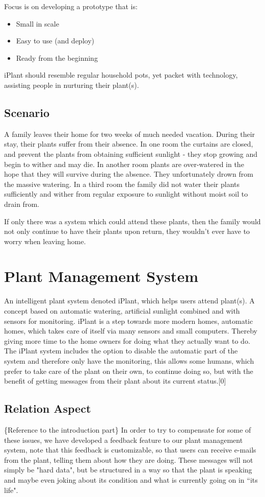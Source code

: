 \documentclass{ubicomp2012}
\begin{document}
Focus is on developing a prototype that is:
\begin{itemize}
    \item Small in scale
    \item Easy to use (and deploy)
    \item Ready from the beginning
\end{itemize}

iPlant should resemble regular household pots, yet packet with technology, assisting people in nurturing their plant(s).

\subsection{Scenario}
A family leaves their home for two weeks of much needed vacation. During their stay, their plants suffer from their absence.
In one room the curtains are closed, and prevent the plants from obtaining sufficient sunlight - they stop growing and begin to wither and may die.
In another room plants are over-watered in the hope that they will survive during the absence. They unfortunately drown from the massive watering.
In a third room the family did not water their plants sufficiently and wither from regular exposure to sunlight without moist soil to drain from.

If only there was a system which could attend these plants, then the family would not only continue to have their plants upon return, they wouldn't ever have to worry when leaving home.

\section{Plant Management System}
An intelligent plant system denoted iPlant, which helps users attend plant(s). A concept based on automatic watering, artificial sunlight combined and with sensors for monitoring.
iPlant is a step towards more modern homes, automatic homes, which takes care of itself via many sensors and small computers. Thereby giving more time to the home owners for doing what they actually want to do.
The iPlant system includes the option to disable the automatic part of the system and therefore only have the monitoring, this allows some humans, which prefer to take care of the plant on their own, to continue doing so, but with the benefit of getting messages from their plant about its current status.[0]

\subsection{Relation Aspect}
\{Reference to the introduction part\}
In order to try to compensate for some of these issues, we have developed a feedback feature to our plant management system, note that this feedback is customizable, so that users can receive e-mails from the plant, telling them about how they are doing. These messages will not simply be "hard data", but be structured in a way so that the plant is speaking and maybe even joking about its condition and what is currently going on in “its life".
\end{document}
